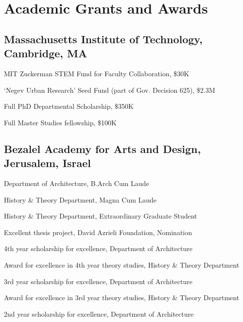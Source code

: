 \section*{Academic Grants and Awards}

\subsection*{Massachusetts Institute of Technology, Cambridge, MA}
\begin{tablist}
    \item[2023] \tab MIT Zuckerman STEM Fund for Faculty Collaboration, \$30K
    \item[2022] \tab `Negev Urban Research' Seed Fund (part of Gov. Decision 625), \$2.3M
    \item[2017] \tab Full PhD Departmental Scholarship, \$350K
    \item[2013] \tab Full Master Studies fellowship, \$100K
\end{tablist}

\subsection*{Bezalel Academy for Arts and Design, Jerusalem, Israel}
\begin{tablist}
    \item[2008] \tab Department of Architecture, B.Arch Cum Laude
    \item[2008] \tab History \& Theory Department, Magna Cum Laude
    \item[2008] \tab History \& Theory Department, Extraordinary Graduate Student
    \item[2008] \tab Excellent thesis project, David Azrieli Foundation, Nomination
    \item[2007] \tab 4th year scholarship for excellence, Department of Architecture
    \item[2007]\tab  Award for excellence in 4th year theory studies, History \& Theory Department
    \item[2006]\tab  3rd year scholarship for excellence, Department of Architecture
    \item[2006]\tab  Award for excellence in 3rd year theory studies, History \& Theory Department
    \item[2005]\tab  2nd year scholarship for excellence, Department of Architecture

\end{tablist}

